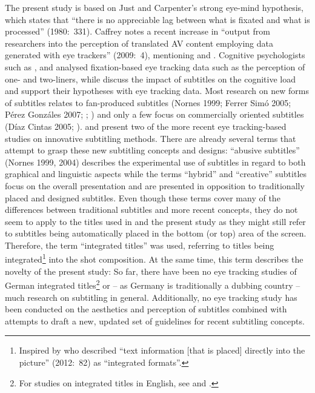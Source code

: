 \documentclass[output=paper]{langsci/langscibook}
\begin{document}
The present study is based on Just and Carpenter's strong eye-mind hypothesis, which states that ``there is no appreciable lag between what is fixated and what is processed'' (1980:~331). Caffrey notes a recent increase in ``output from researchers into the perception of translated AV content employing data generated with eye trackers'' (2009:~4), mentioning \citet{moran2008} and \citet{delmissier2008}. Cognitive psychologists such as \citet{dydewalle1985}, \citet{koolstra1999lengthening} and \citet{Bruycker2007} analysed fixation-based eye tracking data such as the perception of one- and two-liners, while \citet{kruger2013} discuss the impact of subtitles on the cognitive load and support their hypotheses with eye tracking data. Most research on new forms of subtitles relates to fan-produced subtitles (Nornes 1999; Ferrer Simó 2005; Pérez Gonzáles 2007; \citealt{cintas2006}; \citealt{orrego2014}) and only a few focus on commercially oriented subtitles (Díaz Cintas 2005; \citealt{caffrey2009}). \citet{caffrey2009} and \citet{mcclarty2012, mcclarty2013a, mcclarty2013b} present two of the more recent eye tracking-based studies on innovative subtitling methods. There are already several terms that attempt to grasp these new subtitling concepts and designs: ``abusive subtitles'' (Nornes 1999, 2004) describes the experimental use of subtitles in regard to both graphical and linguistic aspects while the terms ``hybrid'' \citep{cintas2006} and ``creative'' \citep{mcclarty2012} subtitles focus on the overall presentation and are presented in opposition to traditionally placed and designed subtitles. Even though these terms cover many of the differences between traditional subtitles and more recent concepts, they do not seem to apply to the titles used in \citet{fox2012} and the present study as they might still refer to subtitles being automatically placed in the bottom (or top) area of the screen. Therefore, the term ``integrated titles'' \citep{fox2012} was used, referring to titles being integrated\footnote{Inspired by \citet{bayram2012} who described ``text information [that is placed] directly into the picture'' (2012:~82) as ``integrated formats''.
} into the shot composition. At the same time, this term describes the novelty of the present study: So far, there have been no eye tracking studies of German integrated titles\footnote{For studies on integrated titles in English, see \citet{mcclarty2013b} and \citet{brown2015}.
} or –  as Germany is traditionally a dubbing country – much research on subtitling in general. Additionally, no eye tracking study has been conducted on the aesthetics and perception of subtitles combined with attempts to draft a new, updated set of guidelines for recent subtitling concepts.
\end{document}
